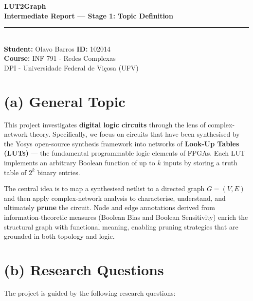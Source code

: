 \documentclass[12pt,a4paper]{article}
\begin{document}
\begin{center}
    {\LARGE \textbf{LUT2Graph}}\\[0.5em]
    {\large \textbf{Intermediate Report --- Stage 1: Topic Definition}}\\[1em]
    \textcolor{gray}{\rule{\textwidth}{1pt}}\\[1em]
    \textbf{Student:} Olavo Barros \quad \textbf{ID:} 102014\\[0.5em]
    \textbf{Course:} INF 791 - Redes Complexas \\[0.5em]
    DPI - Universidade Federal de Viçosa (UFV)
\end{center}
\vspace{0.5em}


\section*{(a) General Topic}

This project investigates \textbf{digital logic circuits} through the lens of
complex-network theory. Specifically, we focus on circuits that have been
synthesised by the Yosys open-source synthesis framework into networks of
\textbf{Look-Up Tables (LUTs)} --- the fundamental programmable logic elements
of FPGAs. Each LUT implements an arbitrary Boolean function of up to $k$
inputs by storing a truth table of $2^{k}$ binary entries.

The central idea is to map a synthesised netlist to a directed graph
$G = (V, E)$ and then apply complex-network analysis to characterise,
understand, and ultimately \textbf{prune} the circuit. Node and edge
annotations derived from information-theoretic measures (Boolean Bias and
Boolean Sensitivity) enrich the structural graph with functional meaning,
enabling pruning strategies that are grounded in both topology and logic.

\section*{(b) Research Questions}

The project is guided by the following research questions:
\end{document}
